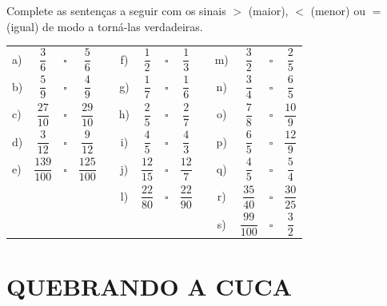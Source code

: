 \begin{atividade}{}


Complete as sentenças a seguir com os sinais $>$ (maior), $<$ (menor) ou $=$ (igual) de modo a torná-las verdadeiras.

\begin{center}
\begin{tabular}{lccccccccccccc}
 a)  &  $\dfrac{3}{6}$     &{\huge $\square$}  &  $\dfrac{5}{6}$   & \parbox[t][.6cm]{2cm}{ } \quad \quad\quad  & f)  &  $\dfrac{1}{2}$     & {\huge $\square$} &  $\dfrac{1}{3}$    & \quad \quad\quad  & m)  &  $\dfrac{3}{2}$     & {\huge $\square$} &  $\dfrac{2}{5}$    \\
 b)  &  $\dfrac{5}{9}$     &{\huge $\square$}&  $\dfrac{4}{9}$   & \parbox[t][.6cm]{2cm}{ }    & g)  &  $\dfrac{1}{7}$     &{\huge $\square$} &  $\dfrac{1}{6}$    &   & n)  &  $\dfrac{3}{4}$     &{\huge $\square$} &  $\dfrac{6}{5}$    \\
 c)  &  $\dfrac{27}{10}$    &{\huge $\square$} &  $\dfrac{29}{10}$   & \parbox[t][.6cm]{2cm}{ }   & h)  &  $\dfrac{2}{5}$     &{\huge $\square$}&  $\dfrac{2}{7}$    &   & o)  &  $\dfrac{7}{8}$     &{\huge $\square$} &  $\dfrac{10}{9}$   \\
 d)  &  $\dfrac{3}{12}$    &{\huge $\square$}&  $\dfrac{9}{12}$   & \parbox[t][.6cm]{2cm}{ }   & i)  &  $\dfrac{4}{5}$     &{\huge $\square$}&  $\dfrac{4}{3}$    &   & p)  &  $\dfrac{6}{5}$     &{\huge $\square$}&  $\dfrac{12}{9}$   \\
 e)  &  $\dfrac{139}{100}$  &{\huge $\square$}&  $\dfrac{125}{100}$ & \parbox[t][.6cm]{2cm}{ }   & j)  &  $\dfrac{12}{15}$   &{\huge $\square$}&  $\dfrac{12}{7}$   &   & q)  &  $\dfrac{4}{5}$     &{\huge $\square$}&  $\dfrac{5}{4}$    \\
     &&                     &    &                  \parbox[t][.6cm]{2cm}{ }    &  l)  &  $\dfrac{22}{80}$   &{\huge $\square$}&  $\dfrac{22}{90}$  &   & r)  &  $\dfrac{35}{40}$   &{\huge $\square$}&  $\dfrac{30}{25}$  \\
     &&                      &    &                    &      &  \parbox[t][.6cm]{2cm}{ }                    &   &                   &   &  s)  &  $\dfrac{99}{100}$  &{\huge $\square$}&  $\dfrac{3}{2}$    \\
\end{tabular}
 \end{center}
\end{atividade}
\section{QUEBRANDO A CUCA }


